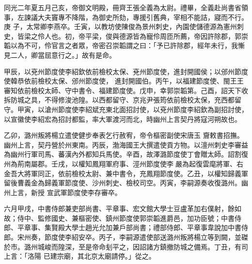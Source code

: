 
\begin{pinyinscope}
同光二年夏五月己亥，帝御文明殿，冊齊王張全義為太尉。禮畢，全義赴尚書省領事，左諫議大夫竇專不降階，為御史所劾，專援引舊典，宰相不能詰，寢而不行。庚
 子，太常卿李燕卒。壬寅，以教坊使陳俊為景州刺史，內園使儲德源為憲州刺史，皆梁之伶人也。初，帝平梁，俊與德源皆為寵伶周匝所薦，帝因許除郡，郭崇韜以為不可，伶官言之者眾，帝密召崇韜謂之曰：「予已許除郡，經年未行，我慚見二人，卿當屈意行之。」故有是命。



 甲辰，以兗州節度使李紹欽依前檢校太保、兗州節度使，進封開國侯；以邠州節度使韓恭依前檢校太保、邠州節度使，
 進封開國伯。丙午，以福建節度使、閩王王審知依前檢校太師、守中書令、福建節度使。戊申，幸郭崇韜第。己酉，詔天下收拆防城之具，不得修浚池隍。以西都留守、京兆尹張筠依前檢校太保，充西都留守。甲寅，以滄州節度使李紹斌充東北面招討使，以兗州節度李紹欽為副招討使，以宣徽使李紹宏為招討都監，率大軍渡河而北，時幽州上言契丹將寇河朔故也。



 乙卯，潞州叛將楊立遣使健步奉表乞行赦宥，帝令樞密副使宋唐玉
 齎敕書招撫。幽州上言，契丹營於州東南。丙辰，渤海國王大撰遣使貢方物。以澶州刺史李審益為幽州行軍司馬、蕃漢內外都知兵馬使。辛酉，故澤潞節度使丁會贈太師。詔割復州為荊南屬郡。壬戌，以權知鳳翔軍府事、涇州節度使李嚴為起復雲麾將軍、右金吾大將軍同正，依前檢校太尉、兼中書令，充鳳翔節度使。乙丑，以權知歸義軍留後曹義金為歸義軍節度使、沙州刺史、檢校司空。丙寅，李嗣源奏收復潞州。幽州上言，新授
 宣武軍節度使李存審卒。



 六月甲戌，中書侍郎兼吏部尚書、平章事、宏文館大學士豆盧革加右僕射，餘如故；侍中、監修國史、兼樞密使、鎮州節度使郭崇韜進爵邑，加功臣號；中書侍郎、平章事、集賢殿大學士趙光允加兼戶部尚書；禮部侍郎、平章事韋說加中書侍郎。宋州奏，節度使李紹安卒。丙子，李嗣源遣使部送潞州叛將楊立等到闕，並磔於市。潞州城峻而隍深，至是帝命刬平之，因詔諸方鎮撤防城之備焉。丁丑，有司上言：「洛陽
 已建宗廟，其北京太廟請停。」從之。



\end{pinyinscope}
